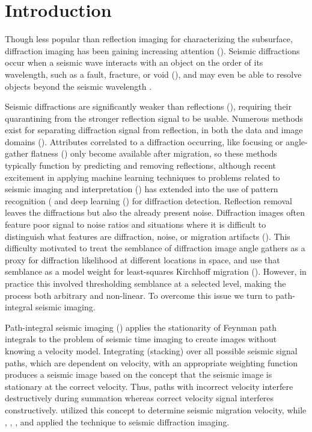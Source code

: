 \section{Introduction}

Though less popular than reflection imaging for characterizing the subsurface, diffraction imaging has been gaining increasing attention (\citealp[]{landaval}).  Seismic diffractions  occur when a seismic wave interacts with an object on the order of its wavelength, such as a fault, fracture, or void (\citealp[]{harl, fomel2, moser, klokov12, deckercarb,pop2015,SCHWARZ20191}), and may even be able to resolve objects beyond the seismic wavelength \cite[]{khadi}.

Seismic diffractions are significantly weaker than  reflections (\citealp[]{klem}), requiring their quarantining from the stronger reflection signal to be usable.  Numerous methods exist for separating diffraction signal from reflection, in both the data and image domains (\citealp{harl,koz,fomel2,moser,berk2009}).  Attributes correlated to a diffraction occurring, like focusing \cite[]{khadi} or angle-gather flatness (\citealp[]{landa08,reshef09}) only become available after migration, so these methods typically function by predicting and removing reflections, although recent excitement in applying machine learning techniques to problems related to seismic imaging and interpretation (\citealp{nam-channel,harpreet-elastic,wu-models}) has extended into the use  of pattern recognition (\citealp{figueiredo-2013} and deep learning (\citealp{tschannen-2020}) for diffraction detection.  Reflection removal leaves the diffractions but also the already present noise. Diffraction images often feature poor signal to noise ratios and situations where it is difficult to distinguish what features are diffraction, noise, or migration artifacts (\citealp[]{harl, fomel2,decker}).  This difficulty motivated \cite{decker2017} to treat the semblance of diffraction image angle gathers as a proxy for diffraction likelihood at different locations in space, and use that semblance as a model weight for least-squares Kirchhoff migration (\citealp{lsinc}).  However, in practice this involved thresholding semblance at a selected level, making the process both arbitrary and non-linear.  To overcome this issue we turn to path-integral seismic imaging.



Path-integral seismic imaging (\citealp{landa2006}) applies the stationarity of Feynman path integrals to the problem of seismic time imaging to create images without knowing a velocity model.  Integrating (stacking) over all possible seismic signal paths, which are dependent on velocity, with an appropriate weighting function produces a seismic image based on the concept that the seismic image is stationary at the correct velocity.  Thus, paths with incorrect velocity interfere destructively during summation whereas correct velocity signal interferes constructively.  \cite{schleicher2009} utilized this concept to determine seismic migration velocity, while \cite{burnett2011}, \cite{merzlikin2017}, \cite{merzlikin2019}, and \cite{merzlikin2020} applied the technique to seismic diffraction imaging.  

